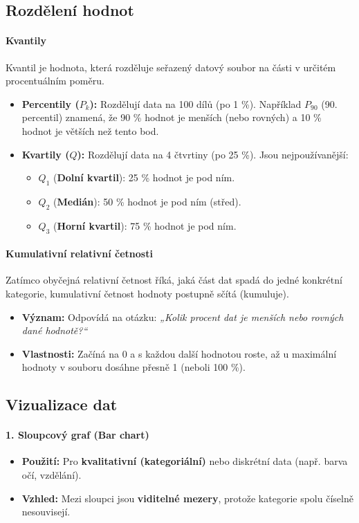 \subsection{Rozdělení hodnot}
\paragraph*{Kvantily}
Kvantil je hodnota, která rozděluje seřazený datový soubor na části v určitém procentuálním poměru. 
\begin{itemize}
    \item \textbf{Percentily ($P_k$):} Rozdělují data na 100 dílů (po 1 \%). Například $P_{90}$ (90. percentil) znamená, že 90 \% hodnot je menších (nebo rovných) a 10 \% hodnot je větších než tento bod.
    \item \textbf{Kvartily ($Q$):} Rozdělují data na 4 čtvrtiny (po 25 \%). Jsou nejpoužívanější:
    \begin{itemize}
        \item $Q_1$ (\textbf{Dolní kvartil}): 25 \% hodnot je pod ním.
        \item $Q_2$ (\textbf{Medián}): 50 \% hodnot je pod ním (střed).
        \item $Q_3$ (\textbf{Horní kvartil}): 75 \% hodnot je pod ním.
    \end{itemize}
\end{itemize}

\paragraph*{Kumulativní relativní četnosti}
Zatímco obyčejná relativní četnost říká, jaká část dat spadá do jedné konkrétní kategorie, kumulativní četnost hodnoty postupně sčítá (kumuluje).
\begin{itemize}
    \item \textbf{Význam:} Odpovídá na otázku: \textit{„Kolik procent dat je menších nebo rovných dané hodnotě?“}
    \item \textbf{Vlastnosti:} Začíná na 0 a s každou další hodnotou roste, až u maximální hodnoty v souboru dosáhne přesně 1 (neboli 100 \%).
\end{itemize}

\subsection{Vizualizace dat}
\paragraph*{1. Sloupcový graf (Bar chart)}
\begin{itemize}
\item \textbf{Použití:} Pro \textbf{kvalitativní (kategoriální)} nebo diskrétní data (např. barva očí, vzdělání).
\item \textbf{Vzhled:} Mezi sloupci jsou \textbf{viditelné mezery}, protože kategorie spolu číselně nesouvisejí.
\end{itemize}

